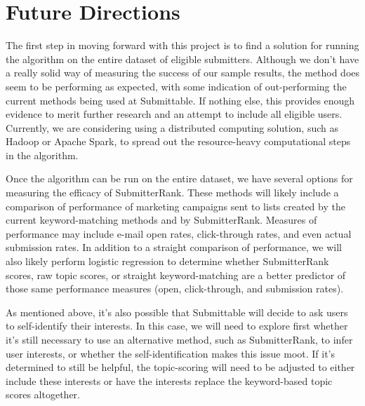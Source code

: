 \documentclass[]{report}   %
\begin{document}
\section{Future Directions}

The first step in moving forward with this project is to find a solution for running the algorithm on the entire dataset of eligible submitters. Although we don't have a really solid way of measuring the success of our sample results, the method does seem to be performing as expected, with some indication of out-performing the current methods being used at Submittable. If nothing else, this provides enough evidence to merit further research and an attempt to include all eligible users. Currently, we are considering using a distributed computing solution, such as Hadoop or Apache Spark, to spread out the resource-heavy computational steps in the algorithm.

Once the algorithm can be run on the entire dataset, we have several options for measuring the efficacy of SubmitterRank. These methods will likely include a comparison of performance of marketing campaigns sent to lists created by the current keyword-matching methods and by SubmitterRank. Measures of performance may include e-mail open rates, click-through rates, and even actual submission rates. In addition to a straight comparison of performance, we will also likely perform logistic regression to determine whether SubmitterRank scores, raw topic scores, or straight keyword-matching are a better predictor of those same performance measures (open, click-through, and submission rates).

As mentioned above, it's also possible that Submittable will decide to ask users to self-identify their interests. In this case, we will need to explore first whether it's still necessary to use an alternative method, such as SubmitterRank, to infer user interests, or whether the self-identification makes this issue moot. If it's determined to still be helpful, the topic-scoring will need to be adjusted to either include these interests or have the interests replace the keyword-based topic scores altogether.




\appendix
\appendixpage
\addappheadtotoc
\end{document}

